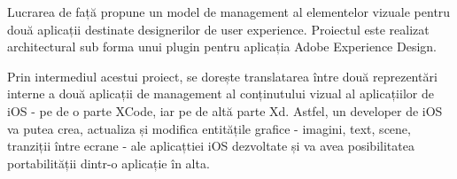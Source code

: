 
\par Lucrarea de față propune un model de management al elementelor vizuale pentru două aplicații destinate designerilor de user experience. Proiectul  este realizat architectural sub forma unui plugin pentru aplicația Adobe Experience Design. 
\par Prin intermediul acestui proiect, se dorește translatarea între două reprezentări interne a două aplicații de management al conținutului vizual al aplicațiilor de iOS - pe de o parte XCode, iar pe de altă parte Xd. Astfel, un developer de iOS va putea crea, actualiza și modifica entitățile grafice - imagini, text, scene, tranziții între ecrane - ale aplicațtiei iOS dezvoltate și va avea posibilitatea portabilității dintr-o aplicație în alta.


